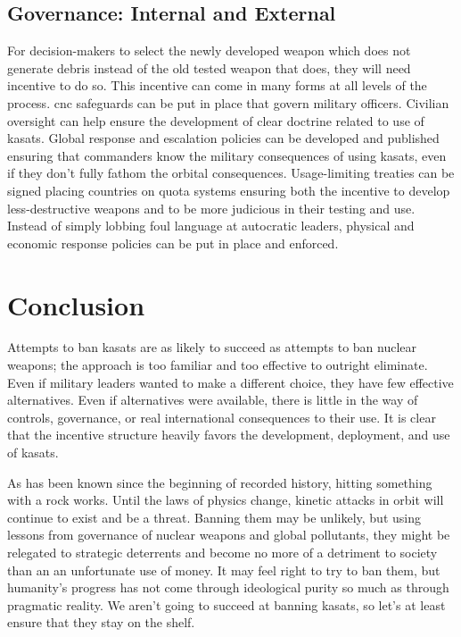 \subsection*{Governance: Internal and External}
For decision-makers to select the newly developed weapon which does
not generate debris instead of the old tested weapon that does, they
will need incentive to do so.  This incentive can come in many forms
at all levels of the process. \ac{cnc} safeguards can be put in place
that govern military officers.  Civilian oversight can help ensure the
development of clear doctrine related to use of \acp{kasat}.  Global
response and escalation policies can be developed and published
ensuring that commanders know the military consequences of using
\acp{kasat}, even if they don't fully fathom the orbital consequences.
Usage-limiting treaties can be signed placing countries on quota
systems ensuring both the incentive to develop less-destructive
weapons and to be more judicious in their testing and use.  Instead of
simply lobbing foul language at autocratic leaders, physical and
economic response policies can be put in place and enforced.

\section*{Conclusion}
Attempts to ban \acp{kasat} are as likely to succeed as attempts to
ban nuclear weapons; the approach is too familiar and too effective to
outright eliminate.  Even if military leaders wanted to make a
different choice, they have few effective alternatives.  Even if
alternatives were available, there is little in the way of controls,
governance, or real international consequences to their use.  It is
clear that the incentive structure heavily favors the development,
deployment, and use of \acp{kasat}.

As has been known since the beginning of recorded history, hitting
something with a rock works.  Until the laws of physics change,
kinetic attacks in orbit will continue to exist and be a threat.
Banning them may be unlikely, but using lessons from governance of
nuclear weapons and global pollutants, they might be relegated to
strategic deterrents and become no more of a detriment to society than
an an unfortunate use of money.  It may feel right to try to ban them,
but humanity's progress has not come through ideological purity so
much as through pragmatic reality.  We aren't going to succeed at
banning \aclp{kasat}, so let's at least ensure that they stay on the
shelf.
